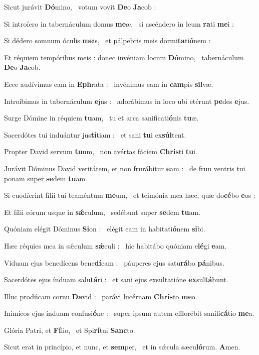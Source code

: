 \documentclass[12pt]{article} %
\newenvironment{psalmtext}{\leftskip 0.25in}{\vspace{1 mm}}
\let\oldgresixstar\gresixstar
\renewcommand{\gresixstar}{\textcolor{benred8}{\oldgresixstar}}
\begin{document}
\begin{psalmtext}
Sicut jurávit \textbf{Dó}mino, \gresixstar\ votum vovit \textbf{De}o \textbf{Ja}cob :

Si introíero in tabernáculum domus \textbf{me}æ, \gresixstar\ si ascéndero in leum \textbf{ra}ti \textbf{me}i :

Si dédero somnum óculis \textbf{me}is, \gresixstar\ et pálpebris meis dormi\textbf{ta}ti\textbf{ó}nem :

Et réquiem tempóribus meis : donec invéniam locum \textbf{Dó}mino, \gresixstar\ tabernáculum \textbf{De}o \textbf{Ja}cob.

Ecce audívimus eam in \textbf{Eph}rata : \gresixstar\ invénimus eam in \textbf{cam}pis \textbf{sil}væ.

Introíbimus in tabernáculum \textbf{e}jus : \gresixstar\ adorábimus in loco ubi etérunt \textbf{pe}des \textbf{e}jus.

Surge Dómine in réquiem \textbf{tu}am, \gresixstar\ tu et arca sanificati\textbf{ó}nis \textbf{tu}æ.

Sacerdótes tui induántur jus\textbf{tí}tiam : \gresixstar\ et sani \textbf{tu}i ex\textbf{súl}tent.

Propter David servum \textbf{tu}um, \gresixstar\ non avértas fáciem \textbf{Chris}ti \textbf{tu}i.

Jurávit Dóminus David veritátem, et non frurábitur \textbf{e}am : \gresixstar\ de fruu ventris tui ponam super \textbf{se}dem \textbf{tu}am.

Si cuodíerint fílii tui teaméntum \textbf{me}um, \gresixstar\ et teimónia mea hæc, quæ do\textbf{cé}bo \textbf{e}os :

Et fílii eórum usque in \textbf{sǽ}culum, \gresixstar\ sedébunt super \textbf{se}dem \textbf{tu}am.

Quóniam elégit Dóminus \textbf{Si}on : \gresixstar\ elégit eam in habitati\textbf{ó}nem \textbf{si}bi.

Hæc réquies mea in sǽculum \textbf{sǽ}culi : \gresixstar\ hic habitábo quóniam e\textbf{lé}gi \textbf{e}am.

Víduam ejus benedícens bene\textbf{dí}cam : \gresixstar\ páuperes ejus satu\textbf{rá}bo \textbf{pá}nibus.

Sacerdótes ejus índuam salu\textbf{tá}ri : \gresixstar\ et sani ejus exsultatióne \textbf{ex}sul\textbf{tá}bunt.

Illuc prodúcam cornu \textbf{Da}vid : \gresixstar\ parávi lucérnam \textbf{Chris}to \textbf{me}o.

Inimícos ejus índuam confusi\textbf{ó}ne : \gresixstar\ super ipsum autem efflorébit sanifi\textbf{cá}tio \textbf{me}a.

Glória Patri, et \textbf{Fí}lio, \gresixstar\ et Spi\textbf{rí}tui \textbf{Sanc}to.

Sicut erat in princípio, et nunc, et\textbf{ sem}per, \gresixstar\ et in sǽcula sæcu\textbf{ló}rum. \textbf{A}men.

\end{psalmtext}
\end{document}
